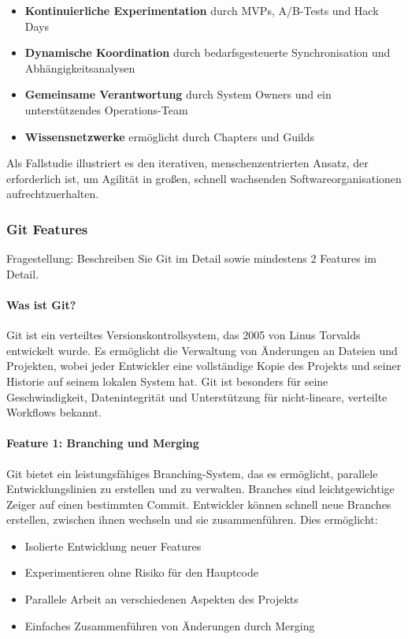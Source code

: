 \begin{itemize}
    \item \textbf{Kontinuierliche Experimentation} durch MVPs, A/B-Tests und Hack Days
    \item \textbf{Dynamische Koordination} durch bedarfsgesteuerte Synchronisation und Abhängigkeitsanalysen
    \item \textbf{Gemeinsame Verantwortung} durch System Owners und ein unterstützendes Operations-Team
    \item \textbf{Wissensnetzwerke} ermöglicht durch Chapters und Guilds
\end{itemize}

Als Fallstudie illustriert es den iterativen, menschenzentrierten Ansatz, der erforderlich ist,
um Agilität in großen, schnell wachsenden Softwareorganisationen aufrechtzuerhalten.

\subsubsection{Git Features}

Fragestellung: Beschreiben Sie Git im Detail sowie mindestens 2 Features im Detail.

\paragraph{Was ist Git?}
Git ist ein verteiltes Versionskontrollsystem, das 2005 von Linus Torvalds entwickelt wurde.
Es ermöglicht die Verwaltung von Änderungen an Dateien und Projekten,
wobei jeder Entwickler eine vollständige Kopie des Projekts und seiner Historie auf seinem lokalen System hat.
Git ist besonders für seine Geschwindigkeit, Datenintegrität und Unterstützung für nicht-lineare, verteilte 
Workflows bekannt. \cite{github-git}

\paragraph{Feature 1: Branching und Merging}
Git bietet ein leistungsfähiges Branching-System, das es ermöglicht, parallele Entwicklungslinien 
zu erstellen und zu verwalten. Branches sind leichtgewichtige Zeiger auf einen bestimmten Commit. 
Entwickler können schnell neue Branches erstellen, zwischen ihnen wechseln und sie zusammenführen. 
Dies ermöglicht:

    \begin{itemize}
        \item Isolierte Entwicklung neuer Features
        \item Experimentieren ohne Risiko für den Hauptcode
        \item Parallele Arbeit an verschiedenen Aspekten des Projekts
        \item Einfaches Zusammenführen von Änderungen durch Merging
    \end{itemize}

